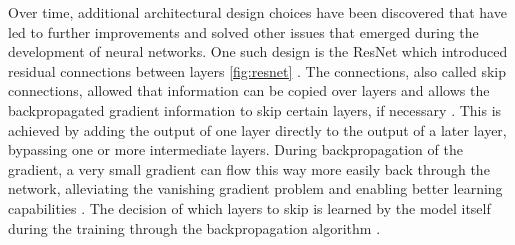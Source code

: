 Over time, additional architectural design choices have been discovered that have led to further improvements and solved other issues that emerged during the development of neural networks.
One such design is the ResNet \cite{he2016DeepResidualLearning} which introduced residual connections between layers \autoref{fig:resnet} \cite{he2016DeepResidualLearning, aggarwal2018NeuralNetworksDeep}.
The connections, also called skip connections, allowed that information can be copied over layers and allows the backpropagated gradient information to skip certain layers, if necessary \cite{he2016DeepResidualLearning, aggarwal2018NeuralNetworksDeep}.
This is achieved by adding the output of one layer directly to the output of a later layer, bypassing one or more intermediate layers.
During backpropagation of the gradient, a very small gradient can flow this way more easily back through the network,  alleviating the vanishing gradient problem and enabling better learning capabilities \cite{he2016DeepResidualLearning, aggarwal2018NeuralNetworksDeep}.
The decision of which layers to skip is learned by the model itself during the training through the backpropagation algorithm \cite{he2016DeepResidualLearning, aggarwal2018NeuralNetworksDeep}.

